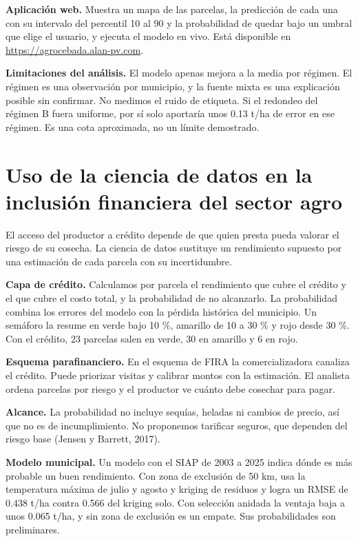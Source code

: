 \documentclass[11pt,letterpaper]{article}
\begin{document}
\textbf{Aplicación web.} Muestra un mapa de las parcelas, la predicción de cada una con su intervalo del percentil 10 al 90 y la probabilidad de quedar bajo un umbral que elige el usuario, y ejecuta el modelo en vivo. Está disponible en \url{https://agrocebada.alan-pv.com}.

\textbf{Limitaciones del análisis.} El modelo apenas mejora a la media por régimen. El régimen es una observación por municipio, y la fuente mixta es una explicación posible sin confirmar. No medimos el ruido de etiqueta. Si el redondeo del régimen B fuera uniforme, por sí solo aportaría unos 0.13 t/ha de error en ese régimen. Es una cota aproximada, no un límite demostrado.

\section{Uso de la ciencia de datos en la inclusión financiera del sector agro}

El acceso del productor a crédito depende de que quien presta pueda valorar el riesgo de su cosecha. La ciencia de datos sustituye un rendimiento supuesto por una estimación de cada parcela con su incertidumbre.

\textbf{Capa de crédito.} Calculamos por parcela el rendimiento que cubre el crédito y el que cubre el costo total, y la probabilidad de no alcanzarlo. La probabilidad combina los errores del modelo con la pérdida histórica del municipio. Un semáforo la resume en verde bajo 10 \%, amarillo de 10 a 30 \% y rojo desde 30 \%. Con el crédito, 23 parcelas salen en verde, 30 en amarillo y 6 en rojo.

\textbf{Esquema parafinanciero.} En el esquema de FIRA la comercializadora canaliza el crédito. Puede priorizar visitas y calibrar montos con la estimación. El analista ordena parcelas por riesgo y el productor ve cuánto debe cosechar para pagar.

\textbf{Alcance.} La probabilidad no incluye sequías, heladas ni cambios de precio, así que no es de incumplimiento. No proponemos tarificar seguros, que dependen del riesgo base (Jensen y Barrett, 2017).

\textbf{Modelo municipal.} Un modelo con el SIAP de 2003 a 2025 indica dónde es más probable un buen rendimiento. Con zona de exclusión de 50 km, usa la temperatura máxima de julio y agosto y kriging de residuos y logra un RMSE de 0.438 t/ha contra 0.566 del kriging solo. Con selección anidada la ventaja baja a unos 0.065 t/ha, y sin zona de exclusión es un empate. Sus probabilidades son preliminares.
\end{document}
